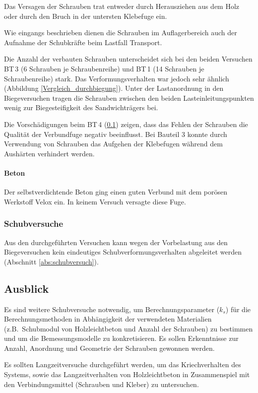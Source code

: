 Das Versagen der Schrauben trat entweder durch Herausziehen aus dem Holz oder durch den Bruch in der untersten Klebefuge ein.

Wie eingangs beschrieben dienen die Schrauben im Auflagerbereich auch der Aufnahme der Schubkräfte beim Lastfall Transport.

Die Anzahl der verbauten Schrauben unterscheidet sich bei den beiden Versuchen BT\,3 (6 Schrauben je Schraubenreihe) und BT\,1 (14 Schrauben je Schraubenreihe) stark. Das Verformungsverhalten war jedoch sehr ähnlich (Abbildung \ref{Vergleich_durchbiegung}). Unter der Lastanordnung in den Biegeversuchen tragen die Schrauben zwischen den beiden Lasteinleitungspunkten wenig zur Biegesteifigkeit des Sandwichträgers bei.

Die Vorschädigungen beim BT\,4 (\ref{}) zeigen, dass das Fehlen der Schrauben die Qualität der Verbundfuge negativ beeinflusst. Bei Bauteil 3 konnte durch Verwendung von Schrauben das Aufgehen der Klebefugen während dem Aushärten verhindert werden.

\paragraph{Beton}

Der selbstverdichtende Beton ging einen guten Verbund mit dem porösen Werkstoff Velox ein. In keinem Versuch versagte diese Fuge. 

\subsubsection{Schubversuche}
Aus den durchgeführten Versuchen kann wegen der Vorbelastung aus den Biegeversuchen kein eindeutiges Schubverformungsverhalten abgeleitet werden (Abschnitt \ref{abs:schubversuch}). 

\subsection{Ausblick}

Es sind weitere Schubversuche notwendig, um Berechnungsparameter ($k_s$) für die Berechnungsmethoden in Abhängigkeit der verwendeten Materialien (z.B.\ Schubmodul von Holzleichtbeton und Anzahl der Schrauben) zu bestimmen und um die Bemessungsmodelle zu konkretisieren. Es sollen Erkenntnisse zur Anzahl, Anordnung und Geometrie der Schrauben gewonnen werden. 

Es sollten Langzeitversuche durchgeführt werden, um das Kriechverhalten des Systems, sowie das Langzeitverhalten von Holzleichtbeton in Zusammenspiel mit den Verbindungsmittel (Schrauben und Kleber) zu untersuchen.

